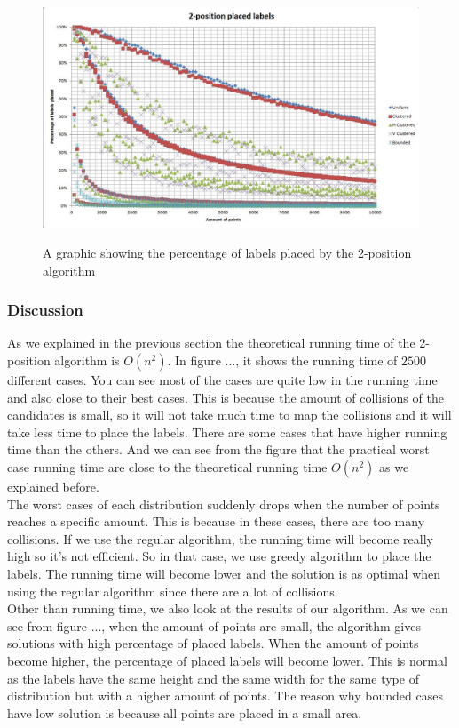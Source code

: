 \documentclass[crop=false,a4paper,oneside,11pt]{standalone}
\begin{document}
\begin{figure}[h!]
 \centering
  \includegraphics[scale = 0.5]{2PosLabelsPlaced.JPG}\\
  \caption{A graphic showing the percentage of labels placed by the 2-position algorithm}
 \end{figure}
\subsubsection{Discussion}
As we explained in the previous section the theoretical running time of the 2-position algorithm is $O(n^2)$. In figure ..., it shows the running time of $2500$ different cases. You can see most of the cases are quite low in the running time and also close to their best cases. This is because the amount of collisions of the candidates is small, so it will not take much time to map the collisions and it will take less time to place the labels. There are some cases that have higher running time than the others. And we can see from the figure that the practical worst case running time are close to the theoretical running time $O(n^2)$ as we explained before. \\
The worst cases of each distribution suddenly drops when the number of points reaches a specific amount. This is because in these cases, there are too many collisions. If we use the regular algorithm, the running time will become really high so it's not efficient. So in that case, we use greedy algorithm to place the labels. The running time will become lower and the solution is as optimal when using the regular algorithm since there are a lot of collisions.\\
Other than running time, we also look at the results of our algorithm. As we can see from figure ..., when the amount of points are small, the algorithm gives solutions with high percentage of placed labels. When the amount of points become higher, the percentage of placed labels will become lower. This is normal as the labels have the same height and the same width for the same type of distribution but with a higher amount of points. The reason why bounded cases have low solution is because all points are placed in a small area.\\
\end{document}

